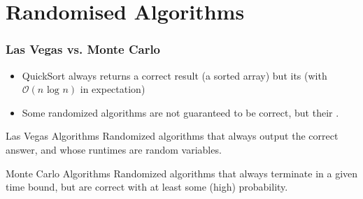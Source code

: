 \documentclass[aspectratio=169]{beamer}
\begin{document}
\section{Randomised Algorithms}


\begin{frame}\frametitle{Las Vegas vs. Monte Carlo}

\begin{itemize}
  \item QuickSort always returns a \alert{correct result} (a sorted array) but its  (with $\mathcal{O}(n\text{ log }n)$ in expectation)
  \item Some randomized algorithms are \alert{not guaranteed to be correct}, but their .
\end{itemize}

\begin{block}{Las Vegas Algorithms}
Randomized algorithms that always output the correct answer, and whose runtimes are random variables.
\end{block}

\begin{alertblock}{Monte Carlo Algorithms}
Randomized algorithms that always terminate in a given time bound, but are correct with at least some (high) probability.
\end{alertblock}

\end{frame}


\end{document}
